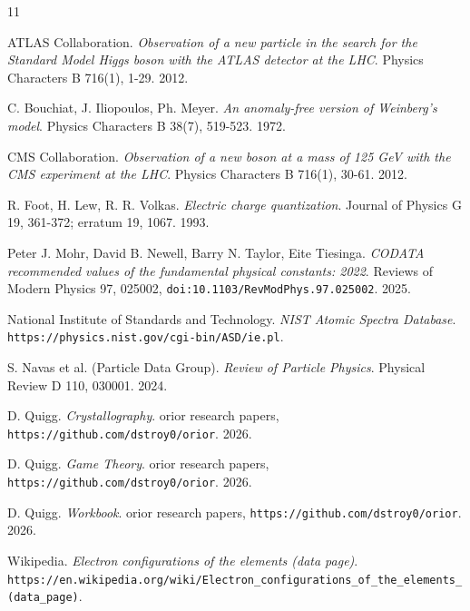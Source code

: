 \backmatter
{}
\begin{thebibliography}{11}

ATLAS Collaboration. \emph{Observation of a new particle in the search for the Standard Model Higgs boson with the ATLAS detector at the LHC}. Physics Characters B 716(1), 1-29. 2012.

C. Bouchiat, J. Iliopoulos, Ph. Meyer. \emph{An anomaly-free version of Weinberg's model}. Physics Characters B 38(7), 519-523. 1972.

CMS Collaboration. \emph{Observation of a new boson at a mass of 125 GeV with the CMS experiment at the LHC}. Physics Characters B 716(1), 30-61. 2012.

R. Foot, H. Lew, R. R. Volkas. \emph{Electric charge quantization}. Journal of Physics G 19, 361-372; erratum 19, 1067. 1993.

Peter J. Mohr, David B. Newell, Barry N. Taylor, Eite Tiesinga. \emph{CODATA recommended values of the fundamental physical constants: 2022}. Reviews of Modern Physics 97, 025002, \texttt{doi:10.1103/\allowbreak{}RevModPhys.97.025002}. 2025.

National Institute of Standards and Technology. \emph{NIST Atomic Spectra Database}. \texttt{https:/\allowbreak{}/\allowbreak{}physics.nist.gov/\allowbreak{}cgi-bin/\allowbreak{}ASD/\allowbreak{}ie.pl}.

S. Navas et al. (Particle Data Group). \emph{Review of Particle Physics}. Physical Review D 110, 030001. 2024.

D. Quigg. \emph{Crystallography}. orior research papers, \texttt{https:/\allowbreak{}/\allowbreak{}github.com/\allowbreak{}dstroy0/\allowbreak{}orior}. 2026.

D. Quigg. \emph{Game Theory}. orior research papers, \texttt{https:/\allowbreak{}/\allowbreak{}github.com/\allowbreak{}dstroy0/\allowbreak{}orior}. 2026.

D. Quigg. \emph{Workbook}. orior research papers, \texttt{https:/\allowbreak{}/\allowbreak{}github.com/\allowbreak{}dstroy0/\allowbreak{}orior}. 2026.

Wikipedia. \emph{Electron configurations of the elements (data page)}. \texttt{https:/\allowbreak{}/\allowbreak{}en.wikipedia.org/\allowbreak{}wiki/\allowbreak{}Electron\_\allowbreak{}configurations\_\allowbreak{}of\_\allowbreak{}the\_\allowbreak{}elements\_\allowbreak{}(data\_\allowbreak{}page)}.

\end{thebibliography}
